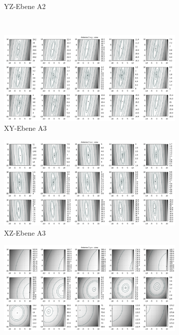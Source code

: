 \begin{appendix}
\begin{landscape}
\begin{figure}[!ht]
\begin{subfigure}[t]{0.5\textwidth}
	             \caption{YZ-Ebene A2}
	\end{subfigure}
\\
	\centering
	\begin{subfigure}[t]{0.5\textwidth}
	     \centering
	     \includegraphics[width=\textwidth]{img/fitness/xy/a2.png}
	             \caption{XY-Ebene A3}
	\end{subfigure}
	\begin{subfigure}[t]{0.5\textwidth}
		\centering
	     \includegraphics[width=\textwidth]{img/fitness/xz/a2.png}
				\caption{XZ-Ebene A3}
	\end{subfigure}
	\begin{subfigure}[t]{0.5\textwidth}
			\centering
	   \includegraphics[width=\textwidth]{img/fitness/yz/a2.png}

\end{subfigure}
\end{figure}
\end{landscape}
\end{appendix}
